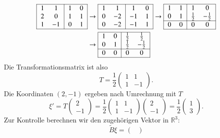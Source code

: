 \begin{beispiel}
\begin{align*}
\begin{tabular}{|>{$}c<{$}>{$}c<{$}|>{$}c<{$}>{$}c<{$}|}
\hline
1& 1&1&0\\
2& 0&1&1\\
1&-1&0&1\\
\hline
\end{tabular}
&\rightarrow
\begin{tabular}{|>{$}c<{$}>{$}c<{$}|>{$}c<{$}>{$}c<{$}|}
\hline
1& 1& 1&0\\
0&-2&-1&1\\
0&-2&-1&1\\
\hline
\end{tabular}
\rightarrow
\begin{tabular}{|>{$}c<{$}>{$}c<{$}|>{$}c<{$}>{$}c<{$}|}
\hline
1& 1&      1&       0\\
0& 1&\frac12&-\frac12\\
\hline
0& 0&      0&       0\\
\hline
\end{tabular}
\\
&\rightarrow
\begin{tabular}{|>{$}c<{$}>{$}c<{$}|>{$}c<{$}>{$}c<{$}|}
\hline
1& 0& \frac12& \frac12\\
0& 1& \frac12&-\frac12\\
\hline
0& 0&      0&       0\\
\hline
\end{tabular}
\end{align*}
Die Transformationsmatrix ist also 
\[
T=
\frac12\begin{pmatrix} 1&1\\1&-1 \end{pmatrix}.
\]
Die Koordinaten $(2,-1)$ ergeben nach Umrechnung mit $T$ 
\[
\xi'=
T\begin{pmatrix}2\\-1\end{pmatrix}
=
\frac12\begin{pmatrix} 1&1\\1&-1 \end{pmatrix}
\begin{pmatrix}2\\-1\end{pmatrix}
=\frac12\begin{pmatrix}1\\3\end{pmatrix}.
\]
Zur Kontrolle berechnen wir den zugehörigen Vektor in $\mathbb R^3$:
\[
\tilde B\xi=
\begin{pmatrix}

\end{pmatrix}\]
\end{beispiel}
